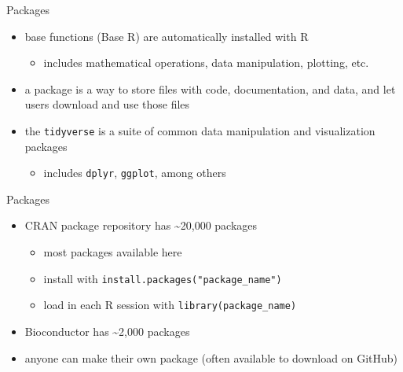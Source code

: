 \documentclass[
  ignorenonframetext,
]{beamer}
\providecommand{\tightlist}{%
  \setlength{\itemsep}{0pt}\setlength{\parskip}{0pt}}
\begin{document}
\begin{frame}[fragile]{Packages}
\label{packages}
\begin{itemize}
\tightlist
\item
  base functions (Base R) are automatically installed with R

  \begin{itemize}
  \tightlist
  \item
    includes mathematical operations, data manipulation, plotting, etc.
  \end{itemize}
\item
  a package is a way to store files with code, documentation, and data,
  and let users download and use those files
\item
  the \texttt{tidyverse} is a suite of common data manipulation and
  visualization packages

  \begin{itemize}
  \tightlist
  \item
    includes \texttt{dplyr}, \texttt{ggplot}, among others
  \end{itemize}
\end{itemize}
\end{frame}

\begin{frame}[fragile]{Packages}
\label{packages-1}
\begin{itemize}
\tightlist
\item
  CRAN package repository has \textasciitilde20,000 packages

  \begin{itemize}
  \tightlist
  \item
    most packages available here
  \item
    install with \texttt{install.packages("package\_name")}
  \item
    load in each R session with \texttt{library(package\_name)}
  \end{itemize}
\item
  Bioconductor has \textasciitilde2,000 packages
\item
  anyone can make their own package (often available to download on
  GitHub)
\end{itemize}
\end{frame}
\end{document}

